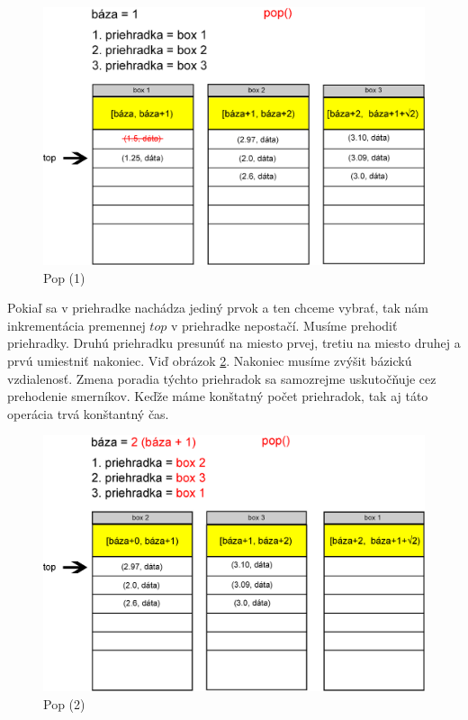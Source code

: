 \begin{figure}[h]
\centering
\includegraphics[width=\textwidth]{./img/priehradky_naplnene_default_i_d1.eps}
\caption{Pop (1)}
\label{fig:priehradky_i_d1}
\end{figure}


Pokiaľ sa v priehradke nachádza jediný prvok a ten chceme vybrať, tak nám inkrementácia premennej $ top $ v priehradke 
nepostačí. Musíme prehodiť priehradky. Druhú priehradku presunúť
na miesto prvej, tretiu na miesto druhej a prvú umiestniť nakoniec. Viď obrázok \ref{fig:priehradky_i_d2}. Nakoniec musíme zvýšit bázickú vzdialenosť. Zmena poradia týchto priehradok sa samozrejme uskutočňuje cez prehodenie smerníkov.
Keďže máme konštatný počet priehradok, tak aj táto operácia
trvá konštantný čas.

\begin{figure}[h]
\centering
\includegraphics[width=\textwidth]{./img/priehradky_naplnene_default_i_d2.eps}
\caption{Pop (2)}
\label{fig:priehradky_i_d2}
\end{figure}


